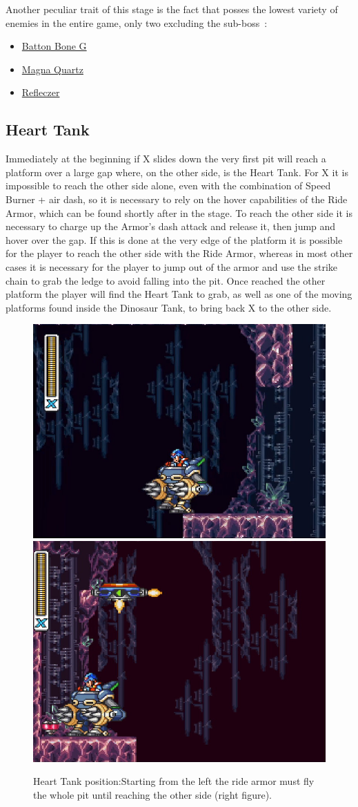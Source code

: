 Another peculiar trait of this stage is the fact that posses the lowest variety of enemies in the entire game, only two excluding the sub-boss~\cite{wiki:Energen_mine}:
\begin{itemize}
	\item \hyperlink {enem:Batton_Bone_type_G}{Batton Bone G}
	\item \hyperlink {miniboss:Magna_Quartz}{Magna Quartz}
	\item \hyperlink {enem:Refleczer}{Refleczer}
\end{itemize}

\subsection{Heart Tank}
Immediately at the beginning if X slides down the very first pit will reach a platform over a large gap where, on the other side, is the Heart Tank. For X it is impossible to reach the other side alone, even with the combination of Speed Burner + air dash, so it is necessary to rely on the hover capabilities of the Ride Armor, which can be found shortly after in the stage. To reach the other side it is necessary to charge up the Armor's dash attack and release it, then jump and hover over the gap. If this is done at the very edge of the platform it is possible for the player to reach the other side with the Ride Armor, whereas in most other cases it is necessary for the player to jump out of the armor and  use the strike chain to grab the ledge to avoid falling into the pit. Once reached the other platform the player will find the Heart Tank to grab, as well as one of the moving platforms found inside the Dinosaur Tank, to bring back X to the other side.
\begin{figure}[htp]
	\centering
	\includegraphics[width=0.45\linewidth]{figures/X2/Crystal_snail/Crystal_heart_starting_spot.png}
	\includegraphics[width=0.45\linewidth]{figures/X2/Crystal_snail/Crystal_heart.png}
	\caption{Heart Tank position:Starting from the left the ride armor must fly the whole pit until reaching the other side (right figure).}
\end{figure}

